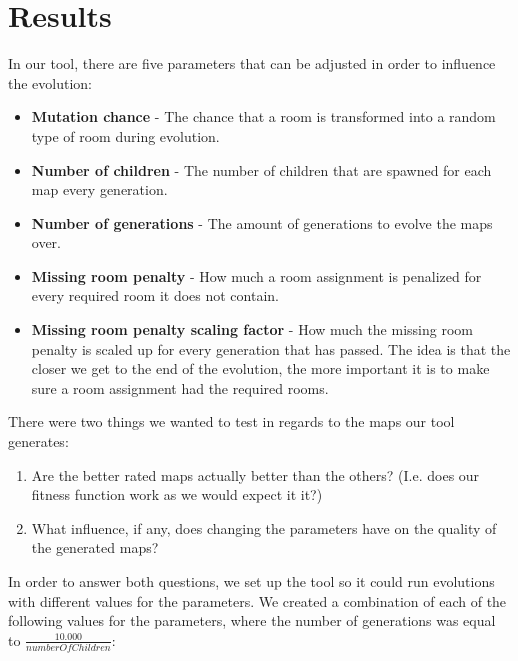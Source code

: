 \section{Results}
\label{05}

In our tool, there are five parameters that can be adjusted in order to influence the evolution: 

\begin{itemize}

	\item \textbf{Mutation chance} - The chance that a room is transformed into a random type of room during evolution.

	\item \textbf{Number of children} - The number of children that are spawned for each map every generation.

	\item \textbf{Number of generations} - The amount of generations to evolve the maps over.

	\item \textbf{Missing room penalty} - How much a room assignment is penalized for every required room it does not contain.

	\item \textbf{Missing room penalty scaling factor} - How much the missing room penalty is scaled up for every generation that has passed. The idea is that the closer we get to the end of the evolution, the more important it is to make sure a room assignment had the required rooms.

\end{itemize}

There were two things we wanted to test in regards to the maps our tool generates:

\begin{enumerate}

	\item Are the better rated maps actually better than the others? (I.e. does our fitness function work as we would expect it it?)

	\item What influence, if any, does changing the parameters have on the quality of the generated maps?

\end{enumerate}

In order to answer both questions, we set up the tool so it could run evolutions with different values for the parameters. We created a combination of each of the following values for the parameters, where the number of generations was equal to $\frac{10.000}{numberOfChildren}$:

